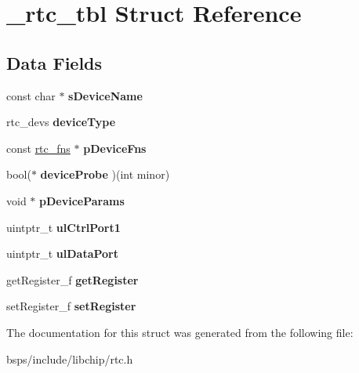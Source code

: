 \hypertarget{struct__rtc__tbl}{}\section{\+\_\+rtc\+\_\+tbl Struct Reference}
\label{struct__rtc__tbl}
\subsection*{Data Fields}
\begin{DoxyCompactItemize}
\item 
\mbox{\label{struct__rtc__tbl_a67b65bc2c605eee751dcc7b33c428722}} 
const char $\ast$ {\bfseries s\+Device\+Name}
\item 
\mbox{\label{struct__rtc__tbl_aca43b22e8673bbce9fe9e8ae373c8308}} 
rtc\+\_\+devs {\bfseries device\+Type}
\item 
\mbox{\label{struct__rtc__tbl_aebdb6fb5c9869d06c089489762edcc48}} 
const \mbox{\hyperlink{struct__rtc__fns}{rtc\+\_\+fns}} $\ast$ {\bfseries p\+Device\+Fns}
\item 
\mbox{\label{struct__rtc__tbl_aee7f904ef99687e60b8a89650789cdd2}} 
bool($\ast$ {\bfseries device\+Probe} )(int minor)
\item 
\mbox{\label{struct__rtc__tbl_aa0ea6b26e1928942b0a9a0c88b836bee}} 
void $\ast$ {\bfseries p\+Device\+Params}
\item 
\mbox{\label{struct__rtc__tbl_a59f3d75969291c197d78dff4a213e822}} 
uintptr\+\_\+t {\bfseries ul\+Ctrl\+Port1}
\item 
\mbox{\label{struct__rtc__tbl_ab1c6b3431a7694ff33ec760cc71cc0d3}} 
uintptr\+\_\+t {\bfseries ul\+Data\+Port}
\item 
\mbox{\label{struct__rtc__tbl_a1664b4db7db055607b43e8922881154b}} 
get\+Register\+\_\+f {\bfseries get\+Register}
\item 
\mbox{\label{struct__rtc__tbl_ad0b782aca5fb70f4c10652eba3b2b20d}} 
set\+Register\+\_\+f {\bfseries set\+Register}
\end{DoxyCompactItemize}


The documentation for this struct was generated from the following file\+:\begin{DoxyCompactItemize}
\item 
bsps/include/libchip/rtc.\+h\end{DoxyCompactItemize}
